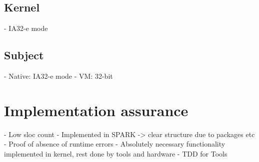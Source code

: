\subsection{Kernel}
- IA32-e mode

\subsection{Subject}
- Native: IA32-e mode
- VM: 32-bit

\section{Implementation assurance}
- Low sloc count
- Implemented in SPARK -> clear structure due to packages etc
- Proof of absence of runtime errors
- Absolutely necessary functionality implemented in kernel, rest done by tools
  and hardware
- TDD for Tools
